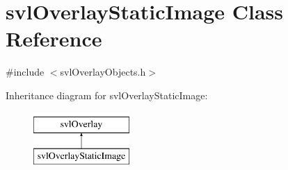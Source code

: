 \hypertarget{classsvl_overlay_static_image}{\section{svl\-Overlay\-Static\-Image Class Reference}
\label{classsvl_overlay_static_image}
}


{\ttfamily \#include $<$svl\-Overlay\-Objects.\-h$>$}

Inheritance diagram for svl\-Overlay\-Static\-Image\-:\begin{figure}[H]
\begin{center}
\leavevmode
\includegraphics[height=2.000000cm]{d8/dd7/classsvl_overlay_static_image}
\end{center}
\end{figure}
